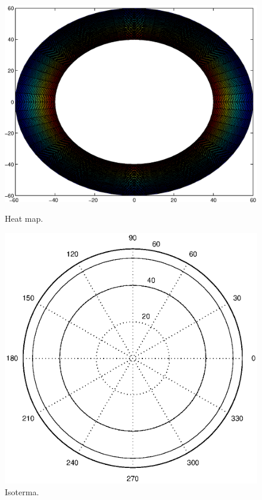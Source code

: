 \begin{figure}[h]
  \centering
  \begin{minipage}[b]{0.35\textwidth}
    \includegraphics[width=\textwidth]{graficos/isotermaIdeal_heat.eps}
    \caption{Heat map.}
  \end{minipage}
  \hspace{1cm}
  \begin{minipage}[b]{0.30\textwidth}
    \includegraphics[width=\textwidth]{graficos/isotermaIdeal.eps}
    \caption{Isoterma.}
  \end{minipage}
\end{figure}

